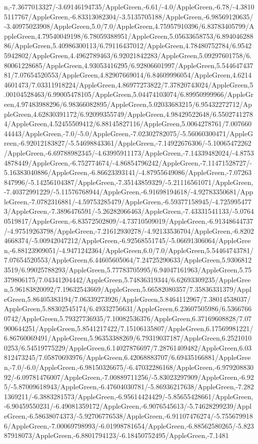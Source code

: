 {\begin{tikzternal}
n,-7.3677013327/-3.69146194735/AppleGreen,-6.61/-4.0/AppleGreen,-6.78/-4.38105117767/AppleGreen,-6.83313082304/-3.5135705188/AppleGreen,-6.98569120635/-3.40975023908/AppleGreen,5.0/7.0/AppleGreen,4.75957910396/6.83783405799/AppleGreen,4.79540049198/6.78059388951/AppleGreen,5.05633658753/6.89404628886/AppleGreen,5.40986300113/6.79116437012/AppleGreen,4.78480752784/6.95425942802/AppleGreen,4.4962789463/6.92021842283/AppleGreen,5.09297601758/6.80061228685/AppleGreen,4.93053416295/6.92806601997/AppleGreen,5.54464743781/7.07654520553/AppleGreen,4.82907669014/6.84609996054/AppleGreen,4.62144601473/7.03311918224/AppleGreen,4.86977273822/7.37820743024/AppleGreen,5.00104528463/6.99005478105/AppleGreen,5.04474103074/6.89950999966/AppleGreen,4.97483988296/6.98366082895/AppleGreen,5.02033683215/6.95432272712/AppleGreen,4.62830391172/6.92099355749/AppleGreen,4.98429522648/6.55027412784/AppleGreen,4.52455509412/6.88145827116/AppleGreen,5.0064278761/7.00766044443/AppleGreen,-7.0/-5.0/AppleGreen,-7.02302782075/-5.56060300471/AppleGreen,-6.92012183827/-5.54698843361/AppleGreen,-7.14922676306/-5.10065472262/AppleGreen,-6.69788982345/-4.63995911173/AppleGreen,-7.14339482024/-4.87534878449/AppleGreen,-6.752774674/-4.86854796242/AppleGreen,-7.11471528727/-5.16383040886/AppleGreen,-6.86623393141/-4.87955649086/AppleGreen,-7.07263847996/-5.14256104387/AppleGreen,-7.35143859329/-5.21116561071/AppleGreen,-7.40372991229/-5.11576768944/AppleGreen,-6.91698194618/-4.92783350681/AppleGreen,-7.0782316881/-4.59753285479/AppleGreen,-6.59377158945/-4.7259954773/AppleGreen,-7.3896476591/-5.26282066463/AppleGreen,-7.43331541133/-5.07640519817/AppleGreen,-6.83572502809/-4.73710509019/AppleGreen,-6.91348644737/-4.97519263798/AppleGreen,-7.21612930278/-4.92133536704/AppleGreen,-6.82024668374/-5.00942047212/AppleGreen,-6.92568551745/-5.06691306064/AppleGreen,-6.88123909051/-4.9471242364/AppleGreen,6.0/7.0/AppleGreen,5.54464743781/7.07654520553/AppleGreen,6.44605605064/7.24725290633/AppleGreen,5.93068123519/6.99025788293/AppleGreen,5.77783705995/6.94047161963/AppleGreen,5.75379806175/7.04341204442/AppleGreen,5.74836319344/6.62693309235/AppleGreen,5.96183820092/7.19632543669/AppleGreen,5.66582080357/7.35836331379/AppleGreen,5.86405383194/7.06339273926/AppleGreen,5.8464112967/7.38014538037/AppleGreen,5.88302545174/6.49332756631/AppleGreen,6.23607505986/6.53667660742/AppleGreen,5.79327736935/7.10082536376/AppleGreen,6.37169608828/7.07900644251/AppleGreen,5.8541217422/7.15106135807/AppleGreen,6.17569981221/6.86760069491/AppleGreen,5.96353388269/6.79319037187/AppleGreen,6.25210100253/6.54519775229/AppleGreen,6.14027876697/7.28761409482/AppleGreen,6.03812473245/7.05870693976/AppleGreen,6.42068883707/6.69435166881/AppleGreen,-7.0/-6.0/AppleGreen,-6.98150326675/-6.47032286168/AppleGreen,-6.97920883092/-6.09781476007/AppleGreen,-7.00889711256/-5.83023297909/AppleGreen,-6.925/-5.87009618943/AppleGreen,-6.47604030781/-5.86936217638/AppleGreen,-7.2821369211/-6.3883281573/AppleGreen,-6.95614424429/-5.85655428661/AppleGreen,-6.90459550231/-6.49081359172/AppleGreen,-6.9076545613/-5.74628299239/AppleGreen,-6.58638074373/-5.92706776538/AppleGreen,-6.91107476274/-5.7556799186/AppleGreen,-7.00069798993/-6.01998781654/AppleGreen,-6.88562580265/-5.82387918073/AppleGreen,-6.8801794123/-6.18450752495/AppleGreen,-7.1481
\end{tikzternal}}
